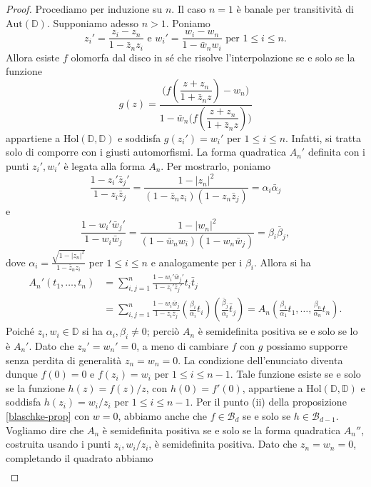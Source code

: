 \begin{proof}
  Procediamo per induzione su $n$. Il caso $n=1$ è banale per transitività di $\text{Aut}(\mathbb{D})$. Supponiamo adesso $n>1$. Poniamo
  $$z_i'=\frac{z_i-z_n}{1-\bar{z}_nz_i} \,\, \text{e} \,\, w_i'=\frac{w_i-w_n}{1-\bar{w}_nw_i} \,\, \text{per} \,\, 1 \le i \le n.$$
  Allora esiste $f$ olomorfa dal disco in sé che risolve l'interpolazione se e solo se la funzione
  $$g(z)=\frac{\Bigg(f\left(\dfrac{z+z_n}{1+\bar{z}_nz}\right)-w_n\Bigg)}{1-\bar{w}_n\Bigg(f\left(\dfrac{z+z_n}{1+\bar{z}_nz}\right)\Bigg)}$$
  appartiene a $\text{Hol}(\mathbb{D},\mathbb{D})$ e soddisfa $g(z_i')=w_i'$ per $1 \le i \le n$. Infatti, si tratta solo di comporre con i giusti automorfismi. La forma quadratica $A_n'$ definita con i punti $z_i',w_i'$ è legata alla forma $A_n$. Per mostrarlo, poniamo
  $$\frac{1-z_i'\bar{z}_j'}{1-z_i\bar{z}_j}=\frac{1-|z_n|^2}{(1-\bar{z}_nz_i)(1-z_n\bar{z}_j)}=\alpha_i\bar{\alpha}_j$$
  e
  $$\frac{1-w_i'\bar{w}_j'}{1-w_i\bar{w}_j}=\frac{1-|w_n|^2}{(1-\bar{w}_nw_i)(1-w_n\bar{w}_j)}=\beta_i\bar{\beta}_j,$$
  dove $\alpha_i=\frac{\sqrt{1-|z_n|^2}}{1-\bar{z}_nz_i}$ per $1 \le i \le n$ e analogamente per i $\beta_i$. Allora si ha
  \begin{align*}
    A_n'(t_1,\dots,t_n) & =\sum_{i,j=1}^n \frac{1-w_i'\bar{w}_j'}{1-z_i'\bar{z}_j'}t_i\bar{t}_j \\
    & =\sum_{i,j=1}^n \frac{1-w_i\bar{w}_j}{1-z_i\bar{z}_j}\left(\frac{\beta_i}{\alpha_i}t_i\right)\left(\frac{\bar{\beta}_j}{\bar{\alpha}_i}\bar{t}_j\right)=A_n\left(\frac{\beta_1}{\alpha_1}t_1,\dots,\frac{\beta_n}{\alpha_n}t_n\right).
  \end{align*}
  Poiché $z_i,w_i \in \mathbb{D}$ si ha $\alpha_i,\beta_i\not=0$; perciò $A_n$ è semidefinita positiva se e solo se lo è $A_n'$. Dato che $z_n'=w_n'=0$, a meno di cambiare $f$ con $g$ possiamo supporre senza perdita di generalità $z_n=w_n=0$. La condizione dell'enunciato diventa dunque $f(0)=0$ e $f(z_i)=w_i$ per $1 \le i \le n-1$.
  Tale funzione esiste se e solo se la funzione $h(z)=f(z)/z$, con $h(0)=f'(0)$, appartiene a $\text{Hol}(\mathbb{D},\mathbb{D})$ e soddisfa $h(z_i)=w_i/z_i$ per $1 \le i \le n-1$. Per il punto (ii) della proposizione \ref{blaschke-prop} con $w=0$, abbiamo anche che $f \in \mathcal{B}_d$ se e solo se $h \in \mathcal{B}_{d-1}$.
  Vogliamo dire che $A_n$ è semidefinita positiva se e solo se la forma quadratica $A_n''$, costruita usando i punti $z_i, w_i/z_i$, è semidefinita positiva. Dato che $z_n=w_n=0$, completando il quadrato abbiamo
  \begin{align*}

\end{align*}
\end{proof}
